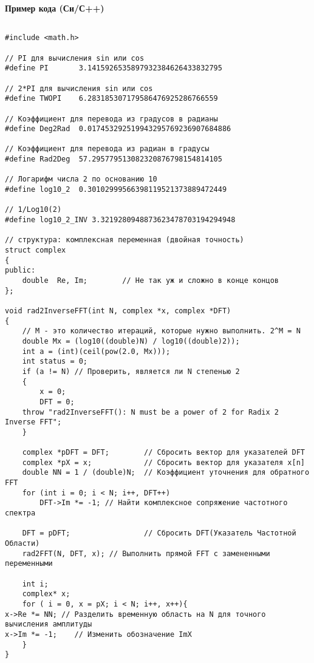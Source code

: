 \vspace{\baselineskip}
\textbf{Пример кода (Си/С++)}

\vspace{\baselineskip}
\begin{tcolorbox}
\begin{verbatim}

#include <math.h>

// PI для вычисления sin или cos
#define PI       3.1415926535897932384626433832795

// 2*PI для вычисления sin или cos
#define TWOPI    6.283185307179586476925286766559

// Коэффициент для перевода из градусов в радианы
#define Deg2Rad  0.017453292519943295769236907684886

// Коэффициент для перевода из радиан в градусы
#define Rad2Deg  57.295779513082320876798154814105

// Логарифм числа 2 по основанию 10 
#define log10_2  0.30102999566398119521373889472449

// 1/Log10(2)
#define log10_2_INV 3.3219280948873623478703194294948

// структура: комплексная переменная (двойная точность) 
struct complex 
{ 
public:    
	double  Re, Im;        // Не так уж и сложно в конце концов 
};

void rad2InverseFFT(int N, complex *x, complex *DFT)
{    
	// M - это количество итераций, которые нужно выполнить. 2^M = N    
	double Mx = (log10((double)N) / log10((double)2));    
	int a = (int)(ceil(pow(2.0, Mx)));
	int status = 0;    
	if (a != N) // Проверить, является ли N степенью 2   
	{        
		x = 0;        
		DFT = 0;        
    throw "rad2InverseFFT(): N must be a power of 2 for Radix 2 Inverse FFT";
	}

	complex *pDFT = DFT;        // Сбросить вектор для указателей DFT    
	complex *pX = x;            // Сбросить вектор для указателя x[n]
	double NN = 1 / (double)N;  // Коэффициент уточнения для обратного FFT 
	for (int i = 0; i < N; i++, DFT++)        
		DFT->Im *= -1; // Найти комплексное сопряжение частотного спектра

	DFT = pDFT;                 // Сбросить DFT(Указатель Частотной Области)    
	rad2FFT(N, DFT, x); // Выполнить прямой FFT с замененными переменными

	int i;    
	complex* x;    
	for ( i = 0, x = pX; i < N; i++, x++){        
x->Re *= NN; // Разделить временную область на N для точного вычисления амплитуды        
x->Im *= -1;    // Изменить обозначение ImX
	}    
}

\end{verbatim}
\end{tcolorbox}

